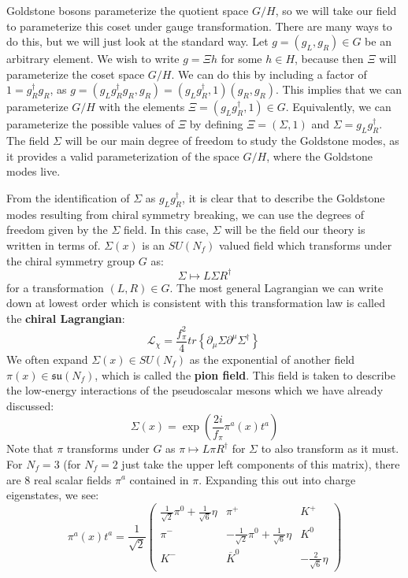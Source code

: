 \documentclass[11pt, oneside]{article}   	%
\theoremstyle{definition}
\numberwithin{equation}{subsection}		%
\begin{document}
Goldstone bosons parameterize the quotient space $G / H$, so we will take our field to parameterize this coset under gauge 
transformation. There are many ways to do this, but we will just look at the standard way. Let $g = (g_L, g_R)\in G$ be an arbitrary 
element. We wish to write $g = \Xi h$ for some $h\in H$, because then $\Xi$ will parameterize the coset space $G / H$. We can do this 
by including a factor of $1 = g_R^\dagger g_R$, as $g = (g_L g_R^\dagger g_R, g_R) = (g_L g_R^\dagger, 1) (g_R, g_R)$. This 
implies that we can parameterize $G / H$ with the elements $\Xi = (g_L g_R^\dagger, 1)\in G$. Equivalently, we can parameterize the 
possible values of $\Xi$ by defining $\Xi = (\Sigma, 1)$ and $\Sigma = g_L g_R^\dagger$. The field $\Sigma$ will be our main degree 
of freedom to study the Goldstone modes, as it provides a valid parameterization of the space $G / H$, where the Goldstone modes live. 

From the identification of $\Sigma$ as $g_L g_R^\dagger$, it is clear that to describe the Goldstone modes resulting from chiral symmetry 
breaking, we can use the degrees of freedom given by the $\Sigma$ field. In this case, $\Sigma$ will be the field our theory is written 
in terms of. $\Sigma(x)$ is an $SU(N_f)$ valued field which transforms under the chiral symmetry group $G$ as:
\begin{equation}
	\Sigma\mapsto L\Sigma R^\dagger
\end{equation}
for a transformation $(L, R)\in G$. The most general Lagrangian we can write down at lowest order which is consistent with this 
transformation law is called the \textbf{chiral Lagrangian}:
\begin{equation}
	\mathcal L_\chi = \frac{f_\pi^2}{4} tr\left\{\partial_\mu\Sigma \partial^\mu\Sigma^\dagger\right\}~
	\label{eq:chiral_lagrangian}
\end{equation}
We often expand $\Sigma(x)\in SU(N_f)$  as the exponential of another field $\pi(x)\in \mathfrak{su}(N_f)$, which is called the 
\textbf{pion field}. This field is taken to describe the low-energy interactions of the pseudoscalar mesons which we have 
already discussed:
\begin{equation}
	\Sigma(x) = \exp\left(\frac{2i}{f_\pi}\pi^a(x) t^a\right)
\end{equation}
Note that $\pi$ transforms under $G$ as $\pi\mapsto L\pi R^\dagger$ for $\Sigma$ to also transform as it must. For $N_f = 3$ (for $N_f = 
2$ just take the upper left components of this matrix), there are 8 real scalar fields $\pi^a$ contained in $\pi$. Expanding this out into 
charge eigenstates, we see:
\begin{equation}
	\pi^a(x) t^a = \frac{1}{\sqrt{2}} \begin{pmatrix} \frac{1}{\sqrt 2} \pi^0 + \frac{1}{\sqrt 6} \eta & \pi^+ & K^+ \\ \pi^- & -\frac{1}{\sqrt 2} \pi^0 + \frac{1}{\sqrt 6} \eta & K^0 \\ K^- & \overline{K}^0 & -\frac{2}{\sqrt 6} \eta  \end{pmatrix}
\end{equation}
\end{document}

